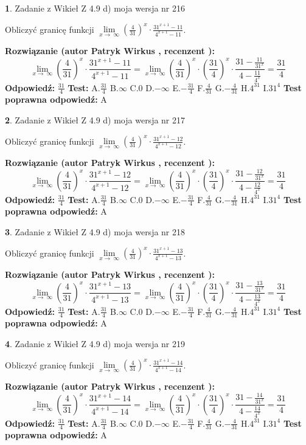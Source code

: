 \documentclass[12pt, a4paper]{article}
\theoremstyle{definition} %
\newtheorem{zad}{}
\newcommand{\zadStart}[1]{\begin{zad}#1\newline}
\newcommand{\zadStop}{\end{zad}}
\newcommand{\rozwStart}[2]{\noindent \textbf{Rozwiązanie (autor #1 , recenzent #2): }\newline}
\newcommand{\rozwStop}{\newline}
\newcommand{\odpStart}{\noindent \textbf{Odpowiedź:}\newline}
\newcommand{\odpStop}{\newline}
\newcommand{\testStart}{\noindent \textbf{Test:}\newline}
\newcommand{\testStop}{\newline}
\newcommand{\kluczStart}{\noindent \textbf{Test poprawna odpowiedź:}\newline}
\newcommand{\kluczStop}{\newline}
\begin{document}
\zadStart{Zadanie z Wikieł Z 4.9 d) moja wersja nr 216}


Obliczyć granicę funkcji  $\lim\limits_{x\to\ \infty}(\frac{4}{31})^{x}\cdot\frac{31^{x+1}-11}{4^{x+1}-11}$.
\zadStop
\rozwStart{Patryk Wirkus}{}
$$\lim\limits_{x\to\ \infty}(\frac{4}{31})^{x}\cdot\frac{31^{x+1}-11}{4^{x+1}-11}=\lim\limits_{x\to\ \infty}(\frac{4}{31})^{x}\cdot(\frac{31}{4})^{x} \cdot \frac{31-\frac{11}{31^{x}}}{4-\frac{11}{4^{x}}} = \frac{31}{4}$$
\rozwStop
\odpStart
$\frac{31}{4}$
\odpStop
\testStart
A.$\frac{31}{4}$ B.$\infty$ C.$0$ D.$-\infty$ E.$-\frac{31}{4}$
F.$\frac{4}{31}$ G.$-\frac{4}{31}$
H.$4^{31}$
I.$31^{4}$
\testStop
\kluczStart
A
\kluczStop



\zadStart{Zadanie z Wikieł Z 4.9 d) moja wersja nr 217}


Obliczyć granicę funkcji  $\lim\limits_{x\to\ \infty}(\frac{4}{31})^{x}\cdot\frac{31^{x+1}-12}{4^{x+1}-12}$.
\zadStop
\rozwStart{Patryk Wirkus}{}
$$\lim\limits_{x\to\ \infty}(\frac{4}{31})^{x}\cdot\frac{31^{x+1}-12}{4^{x+1}-12}=\lim\limits_{x\to\ \infty}(\frac{4}{31})^{x}\cdot(\frac{31}{4})^{x} \cdot \frac{31-\frac{12}{31^{x}}}{4-\frac{12}{4^{x}}} = \frac{31}{4}$$
\rozwStop
\odpStart
$\frac{31}{4}$
\odpStop
\testStart
A.$\frac{31}{4}$ B.$\infty$ C.$0$ D.$-\infty$ E.$-\frac{31}{4}$
F.$\frac{4}{31}$ G.$-\frac{4}{31}$
H.$4^{31}$
I.$31^{4}$
\testStop
\kluczStart
A
\kluczStop



\zadStart{Zadanie z Wikieł Z 4.9 d) moja wersja nr 218}


Obliczyć granicę funkcji  $\lim\limits_{x\to\ \infty}(\frac{4}{31})^{x}\cdot\frac{31^{x+1}-13}{4^{x+1}-13}$.
\zadStop
\rozwStart{Patryk Wirkus}{}
$$\lim\limits_{x\to\ \infty}(\frac{4}{31})^{x}\cdot\frac{31^{x+1}-13}{4^{x+1}-13}=\lim\limits_{x\to\ \infty}(\frac{4}{31})^{x}\cdot(\frac{31}{4})^{x} \cdot \frac{31-\frac{13}{31^{x}}}{4-\frac{13}{4^{x}}} = \frac{31}{4}$$
\rozwStop
\odpStart
$\frac{31}{4}$
\odpStop
\testStart
A.$\frac{31}{4}$ B.$\infty$ C.$0$ D.$-\infty$ E.$-\frac{31}{4}$
F.$\frac{4}{31}$ G.$-\frac{4}{31}$
H.$4^{31}$
I.$31^{4}$
\testStop
\kluczStart
A
\kluczStop



\zadStart{Zadanie z Wikieł Z 4.9 d) moja wersja nr 219}


Obliczyć granicę funkcji  $\lim\limits_{x\to\ \infty}(\frac{4}{31})^{x}\cdot\frac{31^{x+1}-14}{4^{x+1}-14}$.
\zadStop
\rozwStart{Patryk Wirkus}{}
$$\lim\limits_{x\to\ \infty}(\frac{4}{31})^{x}\cdot\frac{31^{x+1}-14}{4^{x+1}-14}=\lim\limits_{x\to\ \infty}(\frac{4}{31})^{x}\cdot(\frac{31}{4})^{x} \cdot \frac{31-\frac{14}{31^{x}}}{4-\frac{14}{4^{x}}} = \frac{31}{4}$$
\rozwStop
\odpStart
$\frac{31}{4}$
\odpStop
\testStart
A.$\frac{31}{4}$ B.$\infty$ C.$0$ D.$-\infty$ E.$-\frac{31}{4}$
F.$\frac{4}{31}$ G.$-\frac{4}{31}$
H.$4^{31}$
I.$31^{4}$
\testStop
\kluczStart
A
\kluczStop
\end{document}
